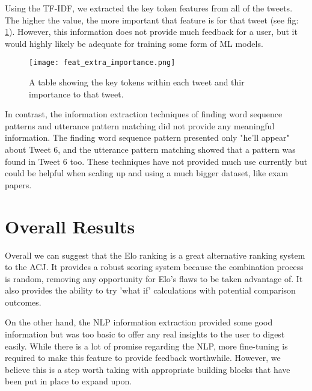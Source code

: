 	Using the TF-IDF, we extracted the key token features from all of the tweets. The higher the value, the more important that feature is for that tweet (see fig: \ref{fig:feature_extract}). However, this information does not provide much feedback for a user, but it would highly likely be adequate for training some form of ML models.

	\begin{figure}[h]
		\centering
		\texttt{[image: feat\_extra\_importance.png]}
		\caption{A table showing the key tokens within each tweet and thir importance to that tweet.}
		\label{fig:feature_extract}
		
	\end{figure}

	In contrast, the information extraction techniques of finding word sequence patterns and utterance pattern matching did not provide any meaningful information. The finding word sequence pattern presented only "he'll appear" about Tweet 6, and the utterance pattern matching showed that a pattern was found in Tweet 6 too. These techniques have not provided much use currently but could be helpful when scaling up and using a much bigger dataset, like exam papers.



\section{Overall Results}
\label{sec:reaults_NLP}

	Overall we can suggest that the Elo ranking is a great alternative ranking system to the ACJ. It provides a robust scoring system because the combination process is random, removing any opportunity for Elo's flaws to be taken advantage of. It also provides the ability to try 'what if' calculations with potential comparison outcomes.
	
	On the other hand, the NLP information extraction provided some good information but was too basic to offer any real insights to the user to digest easily. While there is a lot of promise regarding the NLP, more fine-tuning is required to make this feature to provide feedback worthwhile. However, we believe this is a step worth taking with appropriate building blocks that have been put in place to expand upon.

